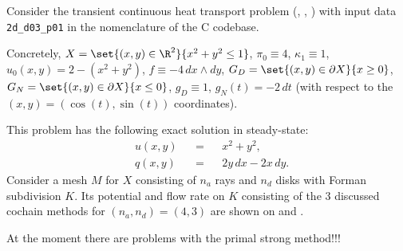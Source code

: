 \begin{example}
  \label{cmc/diffusion/continuous/transient/examples/2d_d03_p01-example}
  Consider the transient continuous heat transport problem
  (,
   ,
   )
  with input data \verb|2d_d03_p01| in the nomenclature of the C codebase.

  Concretely,
    $X = \set{(x, y) \in \R^2}{x^2 + y^2 \leq 1}$,
    $\pi_0 \equiv 4$,
    $\kappa_1 \equiv 1$,
    $u_0(x, y) = 2 - (x^2 + y^2)$,
    $f \equiv - 4 \, d x \wedge d y$,
    $G_D = \set{(x, y) \in \partial X}{x \geq 0}$,
    $G_N = \set{(x, y) \in \partial X}{x \leq 0}$,
    $g_D \equiv 1$,
    $g_N(t) = - 2 \, d t$
    (with respect to the $(x, y) = (\cos(t), \sin(t))$ coordinates).

  This problem has the following exact solution in steady-state:
  \begin{subequations}
    \begin{alignat}{3}
      & u(x, y) && = && x^2 + y^2, \\
      & q(x, y) && = && 2 y \, d x - 2 x \, d y.
    \end{alignat}
  \end{subequations}
  Consider a mesh $M$ for $X$ consisting of $n_a$ rays and $n_d$ disks
  with Forman subdivision $K$.
  Its potential and flow rate on $K$ consisting of the $3$ discussed cochain
  methods for $(n_a, n_d) = (4, 3)$ are shown on
  and
  .

  {\color{red} At the moment there are problems with the primal strong
  method!!!}
\end{example}
